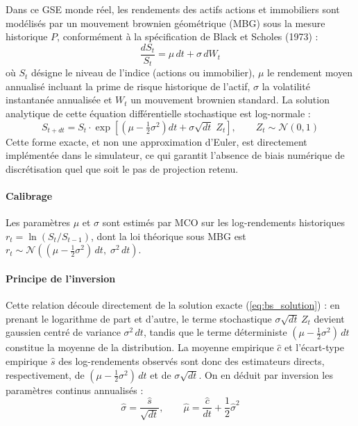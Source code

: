 Dans ce GSE monde réel, les rendements des actifs actions et immobiliers sont modélisés par un mouvement brownien géométrique (MBG) sous la mesure historique $P$, conformément à la spécification de Black et Scholes (1973) :
\begin{equation}
    \frac{dS_t}{S_t} = \mu\,dt + \sigma\,dW_t
\end{equation}
où $S_t$ désigne le niveau de l'indice (actions ou immobilier), $\mu$ le rendement moyen annualisé incluant la prime de risque historique de l'actif, $\sigma$ la volatilité instantanée annualisée et $W_t$ un mouvement brownien standard. La solution analytique de cette équation différentielle stochastique est log-normale :
\begin{equation}
    S_{t+dt} = S_t \cdot \exp\!\left[\left(\mu - \tfrac{1}{2}\sigma^2\right)dt + \sigma\sqrt{dt}\;Z_t\right], \qquad Z_t \sim \mathcal{N}(0,1)
    \label{eq:bs_solution}
\end{equation}
Cette forme exacte, et non une approximation d'Euler, est directement implémentée dans le simulateur, ce qui garantit l'absence de biais numérique de discrétisation quel que soit le pas de projection retenu.

\paragraph{Calibrage}

Les paramètres $\mu$ et $\sigma$ sont estimés par MCO sur les log-rendements historiques $r_t = \ln(S_t/S_{t-1})$, dont la loi théorique sous MBG est $r_t \sim \mathcal{N}\!\left((\mu - \tfrac{1}{2}\sigma^2)\,dt,\;\sigma^2\,dt\right)$.

\paragraph{Principe de l'inversion}
Cette relation découle directement de la solution exacte (\ref{eq:bs_solution}) : en prenant le logarithme de part et d'autre, le terme stochastique $\sigma\sqrt{dt}\,Z_t$ devient gaussien centré de variance $\sigma^2\,dt$, tandis que le terme déterministe $(\mu - \tfrac{1}{2}\sigma^2)\,dt$ constitue la moyenne de la distribution. La moyenne empirique $\hat{c}$ et l'écart-type empirique $\hat{s}$ des log-rendements observés sont donc des estimateurs directs, respectivement, de $(\mu - \tfrac{1}{2}\sigma^2)\,dt$ et de $\sigma\sqrt{dt}$. On en déduit par inversion les paramètres continus annualisés :
\begin{equation}
    \hat{\sigma} = \frac{\hat{s}}{\sqrt{dt}}, \qquad \hat{\mu} = \frac{\hat{c}}{dt} + \frac{1}{2}\hat{\sigma}^2
    \label{eq:bs_calibrage}
\end{equation}

